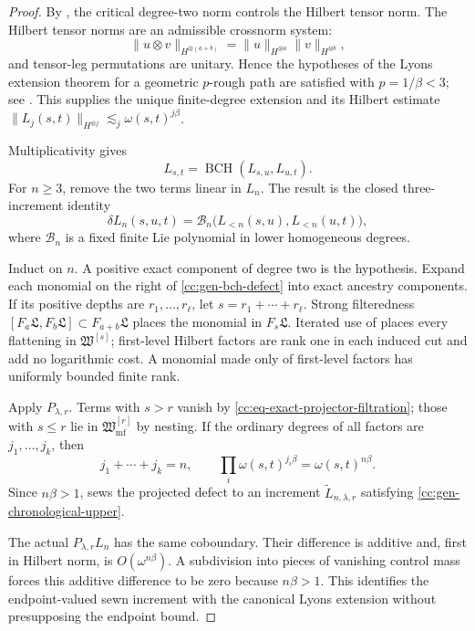 \documentclass[10pt,reqno]{amsart}
\theoremstyle{plain}
\theoremstyle{definition}
\theoremstyle{remark}
\begin{document}
\begin{proof}
By , the critical degree-two norm
controls the Hilbert tensor norm.  The Hilbert tensor norms are an
admissible crossnorm system:
\[
 \|u\otimes v\|_{H^{\otimes(a+b)}}
 =\|u\|_{H^{\otimes a}}\|v\|_{H^{\otimes b}},
\]
and tensor-leg permutations are unitary.  Hence the hypotheses of the
Lyons extension theorem for a geometric \(p\)-rough path are satisfied
with \(p=1/\beta<3\); see \cite{Lyons98}.  This supplies
the unique finite-degree extension and its Hilbert estimate
\(\|L_j(s,t)\|_{H^{\otimes j}}\lesssim_j\omega(s,t)^{j\beta}\).

Multiplicativity gives
\[
 L_{s,t}=\operatorname{BCH}(L_{s,u},L_{u,t}).
\]
For \(n\geq3\), remove the two terms linear in \(L_n\).  The result is
the closed three-increment identity
\begin{equation}
 \delta L_n(s,u,t)
 =
 {\mathcal B}_n\bigl(L_{<n}(s,u),L_{<n}(u,t)\bigr),
 \label{cc:gen-bch-defect}
\end{equation}
where \({\mathcal B}_n\) is a fixed finite Lie polynomial in lower
homogeneous degrees.

Induct on \(n\).  A positive exact component of degree two is the
hypothesis.  Expand each monomial on the right of
\eqref{cc:gen-bch-defect} into exact ancestry components.  If its
positive depths are \(r_1,\ldots,r_\ell\), let
\(s=r_1+\cdots+r_\ell\).  Strong filteredness
\([F_a{\mathfrak L},F_b{\mathfrak L}]\subset F_{a+b}{\mathfrak L}\)
places the monomial in \(F_s{\mathfrak L}\).  Iterated use of
 places every flattening in
\(\mathfrak W^{[s]}\); first-level Hilbert factors are rank one in
each induced cut and add no logarithmic cost.  A monomial made only of
first-level factors has uniformly bounded finite rank.

Apply \(P_{\lambda,r}\).  Terms with \(s>r\) vanish by
\eqref{cc:eq-exact-projector-filtration}; those with \(s\leq r\) lie in
\(\mathfrak W_{\mathrm{mf}}^{[r]}\) by nesting.  If the ordinary
degrees of all factors are \(j_1,\ldots,j_k\), then
\[
 j_1+\cdots+j_k=n,
 \qquad
 \prod_i\omega(s,t)^{j_i\beta}=\omega(s,t)^{n\beta}.
\]
Since \(n\beta>1\),  sews the
projected defect to an increment
\(\widetilde L_{n,\lambda,r}\) satisfying
\eqref{cc:gen-chronological-upper}.

The actual \(P_{\lambda,r}L_n\) has the same coboundary.  Their
difference is additive and, first in Hilbert norm, is
\(O(\omega^{n\beta})\).  A subdivision into pieces of vanishing control
mass forces this additive difference to be zero because \(n\beta>1\).
This identifies the endpoint-valued sewn increment with the canonical
Lyons extension without presupposing the endpoint bound.


\end{proof}
\end{document}
